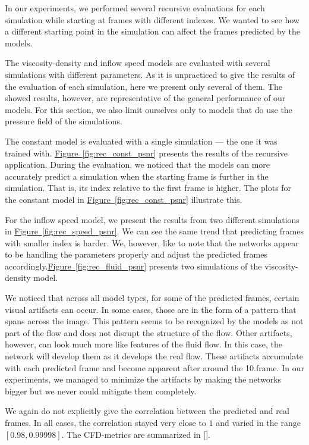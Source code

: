 \documentclass{llncs}
\newcommand{\reffig}[1]{\hyperref[#1]{Figure~\ref*{#1}}}
\begin{document}
In our experiments, we performed several recursive evaluations for each simulation while starting at frames with different indexes. We wanted to see how a different starting point in the simulation can affect the frames predicted by the models.

The viscosity-density and inflow speed models are evaluated with several simulations with different parameters. As it is unpracticed to give the results of the evaluation of each simulation, here we present only several of them. The showed results, however, are representative of the general performance of our models. For this section, we also limit ourselves only to models that do use the pressure field of the simulations.

The constant model is evaluated with a single simulation --- the one it was trained with. \reffig{fig:rec_const_psnr} presents the results of the recursive application. During the evaluation, we noticed that the models can more accurately predict a simulation when the starting frame is further in the simulation. That is, its index relative to the first frame is higher. The plots for the constant model in \reffig{fig:rec_const_psnr} illustrate this.


For the inflow speed model, we present the results from two different simulations in \reffig{fig:rec_speed_psnr}. We can see the same trend that predicting frames with smaller index is harder. We, however, like to note that the networks appear to be handling the parameters properly and adjust the predicted frames accordingly.\reffig{fig:rec_fluid_psnr} presents two simulations of the viscosity-density model.

We noticed that across all model types, for some of the predicted frames, certain visual artifacts can occur. In some cases, those are in the form of a pattern that spans across the image. This pattern seems to be recognized by the models as not part of the flow and does not disrupt the structure of the flow. Other artifacts, however, can look much more like features of the fluid flow. In this case, the network will develop them as it develops the real flow. These artifacts accumulate with each predicted frame and become apparent after around the 10.\@ frame. In our experiments, we managed to minimize the artifacts by making the networks bigger but we never could mitigate them completely.

We again do not explicitly give the correlation between the predicted and real frames. In all cases, the correlation stayed very close to $1$ and varied in the range $[0.98, 0.99998]$. The CFD-metrics are summarized in [].
\end{document}
